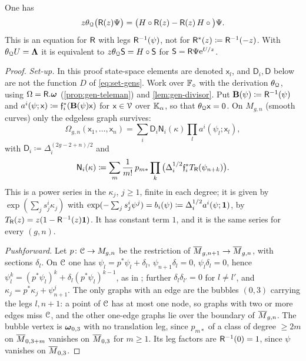 \begin{prop}[Flatness of $\Rm$]
\label{prop:gen-flat}
One has
\[
z\theta_{\mathcal{Q}}\big(\mathsf{R}(z)\Psi\big)=\big(H\circ\mathsf{R}(z)-\mathsf{R}(z)\,H\circ\big)\Psi.
\]
This is an equation for $\Rm$ with legs $\mathsf{R}^{-1}(\psi)$, not for $\mathsf{R}^*(z)\coloneqq\mathsf{R}^{-1}(-z)$. With $\theta_{\mathcal{Q}} U=\mathbf{\Lambda}$ it is equivalent to $z\theta_{\mathcal{Q}}\mathsf{S}=H\circ\mathsf{S}$ for $\mathsf{S}=\mathsf{R}\Psi\mathrm{e}^{U/z}$.
\end{prop}
\begin{proof}
\emph{Set-up.} In this proof state-space elements are denoted $\mathsf{x}_l$, and $\mathsf{D}_i,\mathsf{D}$ below are not the function $D$ of \cref{eq:set-gens}. Work over $\mathbb{F}_{\circ}$ with the derivation $\theta_{\mathcal{Q}}$, using $\Omega=\mathsf{R}.\boldsymbol{\omega}$ (\cref{prop:gen-teleman}) and \cref{lem:gen-divisor}. Put $\mathbf{B}(\psi)\coloneqq\mathsf{R}^{-1}(\psi)$ and $a^i(\psi;\mathsf{x})\coloneqq\mathfrak{f}_i^*(\mathbf{B}(\psi)\mathsf{x})$ for $\mathsf{x}\in\mathcal{V}$ over $\mathbb{K}_{\alpha}$, so that $\theta_{\mathcal{Q}}\mathsf{x}=0$. On $M_{g,n}$ (smooth curves) only the edgeless graph survives:
\[
\Omega_{g,n}(\mathsf{x}_1,\dots,\mathsf{x}_n)=\sum_i\mathsf{D}_i\mathsf{N}_i(\kappa)\prod_la^i(\psi_l;\mathsf{x}_l),
\]
with $\mathsf{D}_i\coloneqq\Delta_i^{(2g-2+n)/2}$ and
\[
\mathsf{N}_i(\kappa)\coloneqq\sum_m\frac{1}{m!}\,p_{m*}\prod_k\big(\Delta_i^{1/2}\mathfrak{f}_i^*T_{\mathsf{R}}(\psi_{n+k})\big).
\]
This is a power series in the $\kappa_j$, $j\geq1$, finite in each degree; it is given by $\exp(\sum_js^i_j\kappa_j)$ with $\exp(-\sum_js^i_j\psi^j)=b_i(\psi)\coloneqq\Delta_i^{1/2}a^i(\psi;\mathbf{1})$, by $T_{\mathsf{R}}(z)=z(1-\mathsf{R}^{-1}(z)\mathbf{1})$. It has constant term $1$, and it is the same series for every $(g,n)$.

\emph{Pushforward.} Let $p\colon\mathcal{C}\to M_{g,n}$ be the restriction of $\overline{M}_{g,n+1}\to\overline{M}_{g,n}$, with sections $\delta_l$. On $\mathcal{C}$ one has $\psi_l=p^*\psi_l+\delta_l$, $\psi_{n+1}\delta_l=0$, $\psi_l\delta_l=0$, hence $\psi_l^k=(p^*\psi_l)^k+\delta_l(p^*\psi_l)^{k-1}$, as in \cite[(2.15)]{Tel12}; further $\delta_l\delta_{l'}=0$ for $l\neq l'$, and $\kappa_j=p^*\kappa_j+\psi_{n+1}^j$. The only graphs with an edge are the bubbles $(0,3)$ carrying the legs $l,n+1$: a point of $\mathcal{C}$ has at most one node, so graphs with two or more edges miss $\mathcal{C}$, and the other one-edge graphs lie over the boundary of $\overline{M}_{g,n}$. The bubble vertex is $\boldsymbol{\omega}_{0,3}$ with no translation leg, since $p_{m*}$ of a class of degree $\geq2m$ on $\overline{M}_{0,3+m}$ vanishes on $\overline{M}_{0,3}$ for $m\geq1$. Its leg factors are $\mathsf{R}^{-1}(0)=1$, since $\psi$ vanishes on $\overline{M}_{0,3}$.


\end{proof}
